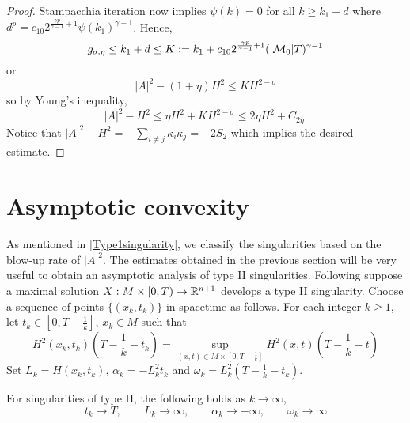 \begin{proof}
        Stampacchia iteration now implies $ \psi(k) = 0 $ for all $ k \ge k_{1}+d $ where $ d^{p} =c_{10}2^{ \frac{\gamma p}{\gamma-1}+1}\psi(k_{1})^{\gamma-1}  $. Hence, 
        \[ g_{\sigma,\eta} \le k_{1}+d\le K := k_{1}+ c_{10} 2^{ \frac{\gamma p}{\gamma-1}+1}(|\mathcal{M}_{0}|T)^{\gamma-1}\]
        or 
        \begin{equation*}
            |A|^{2}-(1+\eta)H^{2} \le KH^{2-\sigma}
        \end{equation*}
        so by Young's inequality, \begin{equation*}
            |A|^{2}-H^{2}\le \eta H^{2}+KH^{2-\sigma} \le 2 \eta H^{2}+C_{2\eta}.
        \end{equation*}
        Notice that $ |A|^{2}-H^{2} = -\sum_{i\neq j}\kappa_{i}\kappa_{j} = -2S_{2} $ which implies the desired estimate.
    \end{proof}

    \section{Asymptotic convexity}
 
    As mentioned in \cref{Type1singularity}, we classify the singularities based on the blow-up rate of $ |A|^{2} $. The estimates obtained in the previous section will be very useful to obtain an asymptotic analysis of type II singularities. Following \cite{huisken1999mean} suppose a maximal solution  $X : M \times [0,T) \to \mathbb{R}^{n+1} $ develops a type II singularity. Choose a sequence of points $ \{(x_{k},t_{k})\} $ in spacetime as follows. For each integer $ k \ge 1 $, let $ t_{k} \in [0,T-\frac{1}{k}] $, $ x_{k} \in M $ such that \begin{equation}
        H^{2}(x_{k},t_{k})\left( T- \frac{1}{k}-t_{k} \right) = \sup_{(x,t) \in M \times\left[0,T-\frac{1}{k}\right]}H^{2}(x,t)\left(  T- \frac{1}{k}- t\right)
    \end{equation}
    Set $ L_{k} = H(x_{k},t_{k}) $, $ \alpha_{k} = -L^{2}_{k}t_{k} $ and $ \omega_{k} = L_{k}^{2}(T-\frac{1}{k}-t_{k}) $. 
    \begin{lemma}
        For singularities of type II, the following holds as $ k \to \infty $, 
        \[ t_{k} \to T, \qquad L_{k} \to \infty,\qquad  \alpha_{k} \to -\infty, \qquad \omega_{k} \to \infty \]
    \end{lemma}